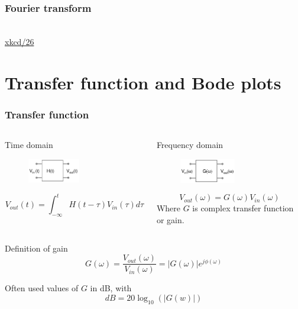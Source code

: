 \documentclass[beamer]{standalone}
\begin{document}
\begin{frame}
\frametitle{Fourier transform}
\begin{center}
 \\
\href{http://xkcd.com/26}{xkcd/26}
\end{center}
\end{frame}


\section{Transfer function and Bode plots}
\begin{frame}
 \frametitle{Transfer function}
   \begin{columns}[t]
    \begin{column}{.45\textwidth}
     Time domain
     \begin{figure}
      \includegraphics[width=0.55\textwidth]{./circuits/black_box_transfer_in_time.pdf}
     \end{figure}
     \[V_{out}(t)=\int^t_{-\infty} H(t-\tau) V_{in}(\tau) d \tau \]
    \end{column}
    \begin{column}{.45\textwidth}
     Frequency domain
     \begin{figure}
      \includegraphics[width=0.55\textwidth]{./circuits/black_box_transfer_in_freq.pdf}
     \end{figure}
     \[V_{out}(\omega)=G(\omega) V_{in}(\omega) \]
     Where $G$ is complex transfer function or gain.
    \end{column}
   \end{columns}
   \begin{block}{Definition of gain}
    \[ G(\omega)=\frac{V_{out}(\omega)}{V_{in}(\omega)} = |G(\omega)| e^{j \phi(\omega)} \]
   \end{block}
   Often used values of $G$ in dB, with
   \[ dB = 20 \log_{10} (|G(w)|) \]
\end{frame}
\end{document}
